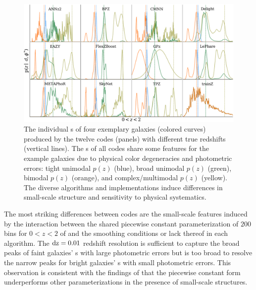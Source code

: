 \begin{figure}
	\centering
	\includegraphics[width=\textwidth]{figures/pzdc1/EXAMPLE_pz_12codes_AIM.pdf}
	\caption[The individual \pzpdf s of four exemplary galaxies produced by twelve \pzpdf\ estimation codes]
		{The individual \pzpdf s of four exemplary galaxies (colored curves) produced by the twelve codes (panels) with different true redshifts (vertical lines).
		The \pzpdf s of all codes share some features for the example galaxies due to physical color degeneracies and photometric errors: tight unimodal $p(z)$ (blue), broad unimodal $p(z)$ (green), bimodal $p(z)$ (orange), and complex/multimodal $p(z)$ (yellow).
		The diverse algorithms and implementations induce differences in small-scale structure and sensitivity to physical systematics.}
\end{figure}

The most striking differences between codes are the small-scale features induced by the interaction between the shared piecewise constant parameterization of $200$ bins for $0 < z < 2$ of  and the smoothing conditions or lack thereof in each algorithm.
The $\rm{d}z = 0.01$ redshift resolution is sufficient to capture the broad peaks of faint galaxies' \pzpdf s with large photometric errors but is too broad to resolve the narrow peaks for bright galaxies' \pzpdf s with small photometric errors.
This observation is consistent with the findings of \citet[]{malz_approximating_2018} that the piecewise constant form underperforms other parameterizations in the presence of small-scale structures.

